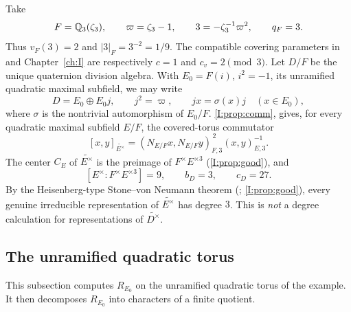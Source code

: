 \begin{example}\label{W:ex:ranktwo-data}
Take
\[
 F=\mathbb Q_3(\zeta_3),\qquad \varpi=\zeta_3-1,\qquad
 3=-\zeta_3^{-1}\varpi^2,\qquad q_F=3.
\]
Thus $v_F(3)=2$ and $|3|_F=3^{-2}=1/9$.  The compatible
covering parameters in \cite{JC26a} and Chapter~\ref{ch:I} are respectively
$c=1$ and $c_v=2\pmod3$.  Let $D/F$ be the unique quaternion
division algebra.  With $E_0=F(i)$, $i^2=-1$, its unramified
quadratic maximal subfield, we may write
\[
 D=E_0\oplus E_0j,\qquad j^2=\varpi,\qquad
 jx=\sigma(x)j\quad(x\in E_0),
\]
where $\sigma$ is the nontrivial automorphism of $E_0/F$.
\cref{I:prop:comm}, gives, for every quadratic maximal
subfield $E/F$, the covered-torus commutator
\begin{equation}\label{W:eq:ranktwo-comm}
 [x,y]_{\widetilde{E^\times}}=
 (N_{E/F}x,N_{E/F}y)_{F,3}^{\,2}
 (x,y)_{E,3}^{-1}.
\end{equation}
The center $C_E$ of $\widetilde{E^\times}$ is the preimage of
$F^\times E^{\times3}$ (\cref{I:prop:good}), and
\[
 [E^\times:F^\times E^{\times3}]=9,
 \qquad b_D=3,\qquad c_D=27.
\]
By the Heisenberg-type Stone--von Neumann theorem
(\cite[Proposition~2.4]{JC26a}; \cref{I:prop:good}), every genuine
irreducible representation of $\widetilde{E^\times}$ has degree $3$.
This is \emph{not} a degree calculation for representations of
$\widetilde{D^\times}$.
\end{example}

\subsection{The unramified quadratic torus}
This subsection computes $R_{E_0}$ on the unramified quadratic torus of the example. It then decomposes $R_{E_0}$ into characters of a finite quotient.

